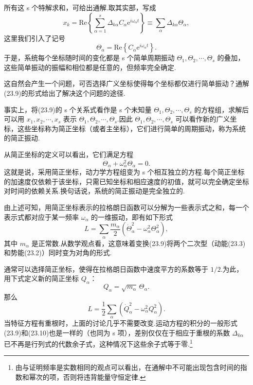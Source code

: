 所有这 s 个特解求和，可给出通解.取其实部，写成
\begin{equation}
  x_k=\mathrm{Re}\left\{\sum_{\alpha=1}^{s}\Delta_{k\alpha}C_\alpha\mathrm{e}^{i\omega_\alpha t}\right\}
  \equiv\sum_\alpha\Delta_{k\alpha}\Theta_\alpha,
\end{equation}
这里我们引入了记号
\begin{equation}
  \Theta_\alpha=\mathrm{Re}\left\{C_\alpha\mathrm{e}^{i\omega_\alpha t}\right\}.
\end{equation}
于是，系统每个坐标随时间的变化都是 s 个简单周期振动 $\Theta_1,\Theta_2,\cdots,\Theta_s$ 的叠加，这些简单振动的振幅和相位都是任意的，但频率完全确定.

这自然会产生一个问题，可否选择广义坐标使得每个坐标都仅进行简单振动？通解(23.9)的形式给出了解决这个问题的途径.

事实上，将(23.9)的 s 个关系式看作是 s 个未知量 $\Theta_1,\Theta_2,\cdots,\Theta_s$ 的方程组，求解后可以用 $x_1,x_2,\cdots,x_s$ 表示 $\Theta_1,\Theta_2,\cdots,\Theta_s$.因此 $\Theta_1,\Theta_2,\cdots,\Theta_s$ 可以看作新的广义坐标，这些坐标称为简正坐标（或者主坐标），它们进行简单的周期振动，称为系统的简正振动.

从简正坐标的定义可以看出，它们满足方程
\begin{equation}
  \ddot{\Theta}_\alpha+\omega_\alpha^2\Theta_\alpha=0.
\end{equation}
这就是说，采用简正坐标，动力学方程组变为 s 个相互独立的方程.每个简正坐标的加速度仅依赖于该坐标，只需已知坐标和相应速度的初值，就可以完全确定坐标对时间的依赖关系.换句话说，系统的简正振动是完全独立的.

由上述可知，用简正坐标表示的拉格朗日函数可以分解为一些表示式之和，每一个表示式都对应于某一频率 $\omega_\alpha$ 的一维振动，即有如下形式
\begin{equation}
  L=\sum_\alpha\frac{m_\alpha}{2}\left(\dot{\Theta}_\alpha^2-\omega_\alpha^2\Theta_\alpha^2\right),
\end{equation}
其中 $m_\alpha$ 是正常数.从数学观点看，这意味着变换(23.9)将两个二次型（动能(23.3)和势能(23.2)）同时变为对角的形式.

通常可以选择简正坐标，使得在拉格朗日函数中速度平方的系数等于 $1/2$.为此，用下式定义新的简正坐标 $Q_\alpha$：
\begin{equation}
  Q_\alpha=\sqrt{m_\alpha}\,\Theta_\alpha.
\end{equation}
那么
\begin{equation*}
  L=\frac{1}{2}\sum_\alpha\left(\dot{Q}_\alpha^2-\omega_\alpha^2Q_\alpha^2\right).
\end{equation*}
当特征方程有重根时，上面的讨论几乎不需要改变.运动方程的积分的一般形式(23.9)和(23.10)也是一样的（也同为 s 项），差别仅仅在于相应于重根的系数 $\Delta_{k\alpha}$ 已不再是行列式的代数余子式，这种情况下这些余子式等于零.\footnote{由与证明频率是实数相同的观点可以看出，在通解中不可能出现包含时间的指数和幂次的项，否则将违背能量守恒定律.}

